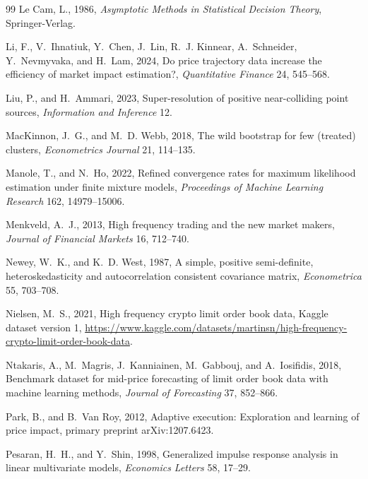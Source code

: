 \documentclass[12pt]{article}
\theoremstyle{definition}
\theoremstyle{remark}
\begin{document}
\begin{thebibliography}{99}
Le Cam, L., 1986, \emph{Asymptotic Methods in Statistical Decision Theory}, Springer-Verlag.

Li, F., V.~Ihnatiuk, Y.~Chen, J.~Lin, R.~J. Kinnear, A.~Schneider, Y.~Nevmyvaka, and H.~Lam, 2024, Do price trajectory data increase the efficiency of market impact estimation?, \emph{Quantitative Finance} 24, 545--568.

Liu, P., and H.~Ammari, 2023, Super-resolution of positive near-colliding point sources, \emph{Information and Inference} 12.

MacKinnon, J.~G., and M.~D. Webb, 2018, The wild bootstrap for few (treated) clusters, \emph{Econometrics Journal} 21, 114--135.

Manole, T., and N.~Ho, 2022, Refined convergence rates for maximum likelihood estimation under finite mixture models, \emph{Proceedings of Machine Learning Research} 162, 14979--15006.

Menkveld, A.~J., 2013, High frequency trading and the new market makers, \emph{Journal of Financial Markets} 16, 712--740.

Newey, W.~K., and K.~D. West, 1987, A simple, positive semi-definite, heteroskedasticity and autocorrelation consistent covariance matrix, \emph{Econometrica} 55, 703--708.

Nielsen, M.~S., 2021, High frequency crypto limit order book data, Kaggle dataset version 1, \url{https://www.kaggle.com/datasets/martinsn/high-frequency-crypto-limit-order-book-data}.

Ntakaris, A., M.~Magris, J.~Kanniainen, M.~Gabbouj, and A.~Iosifidis, 2018, Benchmark dataset for mid-price forecasting of limit order book data with machine learning methods, \emph{Journal of Forecasting} 37, 852--866.

Park, B., and B.~Van Roy, 2012, Adaptive execution: Exploration and learning of price impact, primary preprint arXiv:1207.6423.

Pesaran, H.~H., and Y.~Shin, 1998, Generalized impulse response analysis in linear multivariate models, \emph{Economics Letters} 58, 17--29.


\end{thebibliography}
\end{document}
